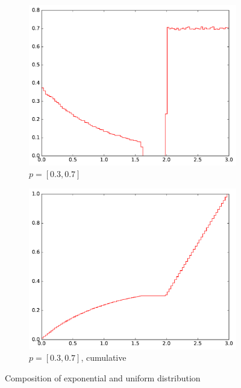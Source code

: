 \begin{figure}[h]
\begin{subfigure}[b]{0.49\textwidth}
        \includegraphics[width=\textwidth]{figs/composed_dist_30_70.pdf}
        \caption{$p = [0.3, 0.7]$}
    \end{subfigure}
    \begin{subfigure}[b]{0.49\textwidth}
        \includegraphics[width=\textwidth]{figs/composed_dist_30_70_cum.pdf}
        \caption{$p = [0.3, 0.7]$, cumulative}
    \end{subfigure}
    \caption{Composition of exponential and uniform distribution}
     \label{fig:composition_exp_uniform}
\end{figure}


